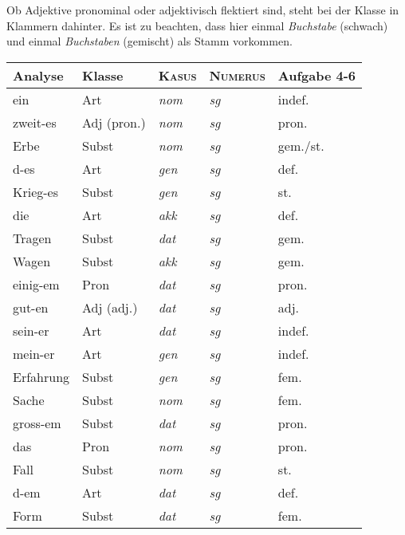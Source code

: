 
\label{sol:nominalflexion01}

Ob Adjektive pronominal oder adjektivisch flektiert sind, steht bei der Klasse in Klammern dahinter.
Es ist zu beachten, dass hier einmal \textit{Buchstabe} (schwach) und einmal \textit{Buchstaben} (gemischt) als Stamm vorkommen.

\begin{center}
  \begin{tabular}{lllll}
    \lsptoprule
    \textbf{Analyse} & \textbf{Klasse} & \textbf{\textsc{Kasus}} & \textbf{\textsc{Numerus}} & \textbf{Aufgabe 4-6} \\
    \midrule
    ein & Art & \textit{nom} & \textit{sg} & indef. \\
    zweit-es & Adj (pron.) & \textit{nom} & \textit{sg} & pron. \\
    Erbe & Subst & \textit{nom} & \textit{sg} & gem./st. \\
    d-es & Art & \textit{gen} & \textit{sg} & def. \\
    Krieg-es & Subst & \textit{gen} & \textit{sg} & st. \\
    die & Art & \textit{akk} & \textit{sg} & def. \\
    Tragen & Subst & \textit{dat} & \textit{sg} & gem. \\
    Wagen & Subst & \textit{akk} & \textit{sg} & gem. \\
    einig-em & Pron & \textit{dat} & \textit{sg} & pron. \\
    gut-en & Adj (adj.) & \textit{dat} & \textit{sg} & adj. \\
    sein-er & Art & \textit{dat} & \textit{sg} & indef. \\
    mein-er & Art & \textit{gen} & \textit{sg} & indef. \\
    Erfahrung & Subst & \textit{gen} & \textit{sg} & fem. \\
    Sache & Subst & \textit{nom} & \textit{sg} & fem. \\
    gross-em & Subst & \textit{dat} & \textit{sg} & pron. \\
    das & Pron & \textit{nom} & \textit{sg} & pron. \\
    Fall & Subst & \textit{nom} & \textit{sg} & st. \\
    d-em & Art & \textit{dat} & \textit{sg} & def. \\
    Form & Subst & \textit{dat} & \textit{sg} & fem. \\

\end{tabular}
\end{center}
